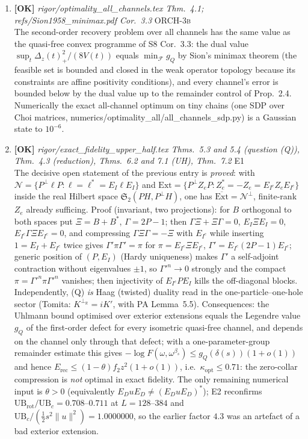 \documentclass[11pt]{article}
\begin{document}
\begin{enumerate}[leftmargin=1.6em,itemsep=6pt]
\item \textbf{[OK]} \emph{rigor/optimality\_all\_channels.tex Thm.~4.1; refs/Sion1958\_minimax.pdf Cor.~3.3} \hfill\textsc{ORCH-3b}\\ The second-order recovery problem over all channels has the same value as the quasi-free convex programme of S8 Cor.~3.3: the dual value \(\sup_t\Delta_z(t)_+^2/(8V(t))\) equals \(\min_{\mathcal F}g_Q\) by Sion's minimax theorem (the feasible set is bounded and closed in the weak operator topology because its constraints are affine positivity conditions), and every channel's error is bounded below by the dual value up to the remainder control of Prop.~2.4. Numerically the exact all-channel optimum on tiny chains (one SDP over Choi matrices, numerics/optimality\_all/all\_channels\_sdp.py) is a Gaussian state to \(10^{-6}\).
\item \textbf{[OK]} \emph{rigor/exact\_fidelity\_upper\_half.tex Thms.~5.3 and 5.4 (question (Q)), Thm.~4.3 (reduction), Thms.~6.2 and 7.1 (UH), Thm.~7.2} \hfill\textsc{E1}\\ The decisive open statement of the previous entry is \emph{proved}: with \(\mathcal N=\{P^{\perp}\ell P:\ell=\ell^{*}=E_I\ell E_I\}\) and \(\mathrm{Ext}=\{P^{\perp}Z_eP:Z_e^{*}=-Z_e=E_{I^c}Z_eE_{I^c}\}\) inside the real Hilbert space \(\mathfrak S_2(PH,P^{\perp}H)\), one has \(\overline{\mathrm{Ext}}=\mathcal N^{\perp}\), finite-rank \(Z_e\) already sufficing. Proof (invariant, two projections): for \(B\) orthogonal to both spaces put \(\Xi=B+B^{*}\), \(\Gamma=2P-1\); then \(\Gamma\Xi+\Xi\Gamma=0\), \(E_I\Xi E_I=0\), \(E_{I^c}\Gamma\Xi E_{I^c}=0\), and compressing \(\Gamma\Xi\Gamma=-\Xi\) with \(E_{I^c}\) while inserting \(1=E_I+E_{I^c}\) twice gives \(\Gamma'\pi\Gamma'=\pi\) for \(\pi=E_{I^c}\Xi E_{I^c}\), \(\Gamma'=E_{I^c}(2P-1)E_{I^c}\); generic position of \((P,E_I)\) (Hardy uniqueness) makes \(\Gamma'\) a self-adjoint contraction without eigenvalues \(\pm1\), so \(\Gamma'^n\to0\) strongly and the compact \(\pi=\Gamma'^n\pi\Gamma'^n\) vanishes; then injectivity of \(E_{I^c}PE_I\) kills the off-diagonal blocks. Independently, (Q) \emph{is} Haag (twisted) duality read in the one-particle--one-hole sector (Tomita: \(K^{\perp_{\mathbb R}}=iK'\), with PA Lemma~5.5). Consequences: the Uhlmann bound optimised over exterior extensions equals the Legendre value \(g_Q\) of the first-order defect for every isometric quasi-free channel, and depends on the channel only through that defect; with a one-parameter-group remainder estimate this gives \(-\log F(\omega,\omega^{\beta_s})\le g_Q(\delta(s))(1+o(1))\) and hence \(E_{\mathrm{rec}}\le(1-\theta)f_2z^2(1+o(1))\), i.e.\ \(\kappa_{\mathrm{opt}}\le0.71\): the zero-collar compression is \emph{not} optimal in exact fidelity. The only remaining numerical input is \(\theta>0\) (equivalently \(E_DuE_D\ne(E_DuE_D)^{*}\)); E2 reconfirms \(\mathrm{UB}_{\mathrm{rot}}/\mathrm{UB}_c=0.708\)--\(0.711\) at \(L=128\)--\(384\) and \(\mathrm{UB}_c/(\tfrac12s^2\lVert u\rVert^2)=1.0000000\), so the earlier factor \(4.3\) was an artefact of a bad exterior extension.

\end{enumerate}
\end{document}
